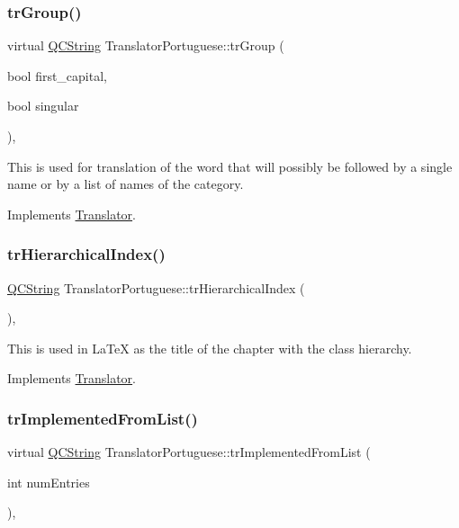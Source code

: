 \subsubsection{\texorpdfstring{trGroup()}{trGroup()}}
{\footnotesize\ttfamily virtual \mbox{\hyperlink{class_q_c_string}{Q\+C\+String}} Translator\+Portuguese\+::tr\+Group (\begin{DoxyParamCaption}\item[{bool}]{first\+\_\+capital,  }\item[{bool}]{singular }\end{DoxyParamCaption})\hspace{0.3cm}{\ttfamily [inline]}, {\ttfamily [virtual]}}

This is used for translation of the word that will possibly be followed by a single name or by a list of names of the category. 

Implements \mbox{\hyperlink{class_translator}{Translator}}.

\mbox{\label{class_translator_portuguese_a46fb7c3e8866eb4734dce3cf93d8644b}} 
\subsubsection{\texorpdfstring{trHierarchicalIndex()}{trHierarchicalIndex()}}
{\footnotesize\ttfamily \mbox{\hyperlink{class_q_c_string}{Q\+C\+String}} Translator\+Portuguese\+::tr\+Hierarchical\+Index (\begin{DoxyParamCaption}{ }\end{DoxyParamCaption})\hspace{0.3cm}{\ttfamily [inline]}, {\ttfamily [virtual]}}

This is used in La\+TeX as the title of the chapter with the class hierarchy. 

Implements \mbox{\hyperlink{class_translator}{Translator}}.

\mbox{\label{class_translator_portuguese_abf92ebb4a3d3fece734b9224b91f199b}} 
\subsubsection{\texorpdfstring{trImplementedFromList()}{trImplementedFromList()}}
{\footnotesize\ttfamily virtual \mbox{\hyperlink{class_q_c_string}{Q\+C\+String}} Translator\+Portuguese\+::tr\+Implemented\+From\+List (\begin{DoxyParamCaption}\item[{int}]{num\+Entries }\end{DoxyParamCaption})\hspace{0.3cm}{\ttfamily [inline]}, {\ttfamily [virtual]}}


